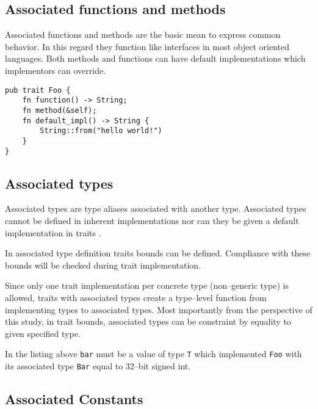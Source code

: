 \subsection{Associated functions and methods}

Associated functions and methods are the basic mean to express common behavior.
In this regard they function like interfaces in most object oriented languages.
Both methods and functions can have default implementations which implementors can override.

\begin{lstlisting}
pub trait Foo {
    fn function() -> String;
    fn method(&self);
    fn default_impl() -> String {
        String::from("hello world!")
    }
}

\end{lstlisting}

\subsection{Associated types}

Associated types are type aliases associated with another type. Associated types cannot be defined in inherent implementations nor can they be given a default implementation in traits \cite{rustreference}.



In associated type definition traits bounds can be defined. Compliance with these bounds will be checked during trait implementation.



Since only one trait implementation per concrete type (non--generic type) is allowed, traits with associated types create a type--level function from implementing types to associated types.
Most importantly from the perspective of this study, in trait bounds, associated types can be constraint by equality to given specified type.



In the listing above \texttt{bar} must be a value of type \texttt{T} which implemented \texttt{Foo} with its associated type \texttt{Bar} equal to 32--bit signed int.

\subsection{Associated Constants}

